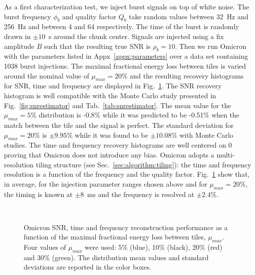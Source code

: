 As a first characterization test, we inject burst signals on top of white noise. The burst frequency $\phi_b$ and quality factor $Q_b$ take random values between 32~Hz and 256~Hz and between 4 and 64 respectively. The time of the burst is randomly drawn in $\pm10$~s around the chunk center. Signals are injected using a fix amplitude $B$ such that the resulting true SNR is $\rho_b=10$. Then we run Omicron with the parameters listed in Appx~\ref{appx:parameters} over a data set containing 1038 burst injections. The maximal fractional energy loss between tiles is varied around the nominal value of $\mu_{max}=20\%$ and the resulting recovery histograms for SNR, time and frequency are displayed in Fig.~\ref{fig:char_mismatch}. The SNR recovery histogram is well compatible with the Monte Carlo study presented in Fig.~\ref{fig:snrestimator} and Tab.~\ref{tab:snrestimator}. The mean value for the $\mu_{max}=5\%$ distribution is -0.8\% while it was predicted to be -0.51\% when the match between the tile and the signal is perfect. The standard deviation for $\mu_{max}=20\%$ is $\pm9.95\%$ while it was found to be $\pm10.08\%$ with Monte Carlo studies. The time and frequency recovery histograms are well centered on 0 proving that Omicron does not introduce any bias. Omicron adopts a multi-resolution tiling structure (see Sec.~\ref{sec:algorithm:tiling}): the time and frequency resolution is a function of the frequency and the quality factor. Fig.~\ref{fig:char_mismatch} show that, in average, for the injection parameter ranges chosen above and for $\mu_{max}=20\%$, the timing is known at $\pm8$~ms and the frequency is resolved at $\pm2.4\%$. 
\begin{figure}
  \center
   \\
  \caption{Omicron SNR, time and frequency reconstruction performance as a function of the maximal fractional energy loss between tiles, $\mu_{max}$. Four values of $\mu_{max}$ were used: 5\% (blue), 10\% (black), 20\% (red) and 30\% (green). The distribution mean values and standard deviations are reported in the color boxes.}
  \label{fig:char_mismatch}
\end{figure}

